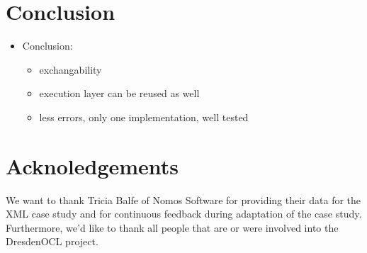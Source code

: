 \section{Conclusion}

\begin{itemize}
  \item Conclusion:
  \begin{itemize}
    \item exchangability
    \item execution layer can be reused as well
    \item less errors, only one implementation, well tested
  \end{itemize}  
\end{itemize}

\section{Acknoledgements}

We want to thank Tricia Balfe of Nomos Software for providing their data for the XML case study and for continuous feedback during adaptation of the case study.
Furthermore, we'd like to thank all people that are or were involved into the DresdenOCL project.